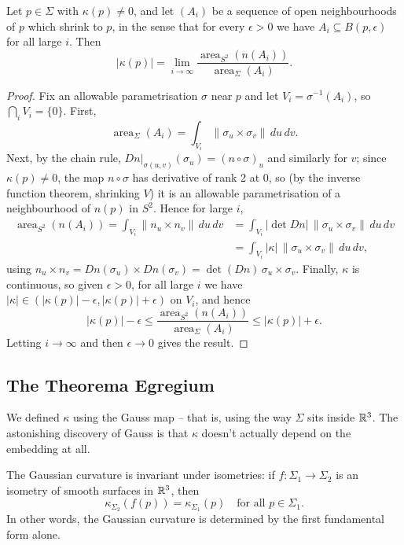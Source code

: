 \documentclass[a4paper]{scrartcl}
\begin{document}
\begin{theorem}\label{thm:curvaturearea}
    Let $p \in \Sigma$ with $\kappa(p) \neq 0$, and let $(A_i)$ be a sequence of open neighbourhoods of $p$ which shrink to $p$, in the sense that for every $\epsilon > 0$ we have $A_i \subseteq B(p, \epsilon)$ for all large $i$. Then
    $$
    |\kappa(p)| = \lim_{i \rightarrow \infty} \frac{\operatorname{area}_{S^2}(n(A_i))}{\operatorname{area}_\Sigma(A_i)}.
    $$
\end{theorem}
\begin{proof}
    Fix an allowable parametrisation $\sigma$ near $p$ and let $V_i = \sigma^{-1}(A_i)$, so $\bigcap_i V_i = \{0\}$. First,
    $$
    \operatorname{area}_\Sigma(A_i) = \int_{V_i} \|\sigma_u \times \sigma_v\| \, du \, dv.
    $$
    Next, by the chain rule, $\left.Dn\right|_{\sigma(u,v)}(\sigma_u) = (n \circ \sigma)_u$ and similarly for $v$; since $\kappa(p) \neq 0$, the map $n \circ \sigma$ has derivative of rank 2 at $0$, so (by the inverse function theorem, shrinking $V$) it is an allowable parametrisation of a neighbourhood of $n(p)$ in $S^2$. Hence for large $i$,
    \begin{align*}
    \operatorname{area}_{S^2}(n(A_i)) = \int_{V_i} \|n_u \times n_v\| \, du\,dv &= \int_{V_i} |{\det Dn}| \, \|\sigma_u \times \sigma_v\| \, du \, dv \\
    &= \int_{V_i} |\kappa| \, \|\sigma_u \times \sigma_v\| \, du \, dv,
    \end{align*}
    using $n_u \times n_v = Dn(\sigma_u) \times Dn(\sigma_v) = \det(Dn) \, \sigma_u \times \sigma_v$.
    Finally, $\kappa$ is continuous, so given $\epsilon > 0$, for all large $i$ we have $|\kappa| \in (|\kappa(p)| - \epsilon, |\kappa(p)| + \epsilon)$ on $V_i$, and hence
    $$
    |\kappa(p)| - \epsilon \leq \frac{\operatorname{area}_{S^2}(n(A_i))}{\operatorname{area}_\Sigma(A_i)} \leq |\kappa(p)| + \epsilon.
    $$
    Letting $i \rightarrow \infty$ and then $\epsilon \rightarrow 0$ gives the result.
\end{proof}

\subsection{The Theorema Egregium}

We defined $\kappa$ using the Gauss map -- that is, using the way $\Sigma$ sits inside $\mathbb{R}^3$. The astonishing discovery of Gauss is that $\kappa$ doesn't actually depend on the embedding at all.

\begin{theorem}\label{thm:egregium}
    The Gaussian curvature is invariant under isometries: if $f: \Sigma_1 \rightarrow \Sigma_2$ is an isometry of smooth surfaces in $\mathbb{R}^3$, then
    $$
    \kappa_{\Sigma_2}(f(p)) = \kappa_{\Sigma_1}(p) \quad \text{for all } p \in \Sigma_1.
    $$
    In other words, the Gaussian curvature is determined by the first fundamental form alone.
\end{theorem}
\end{document}
